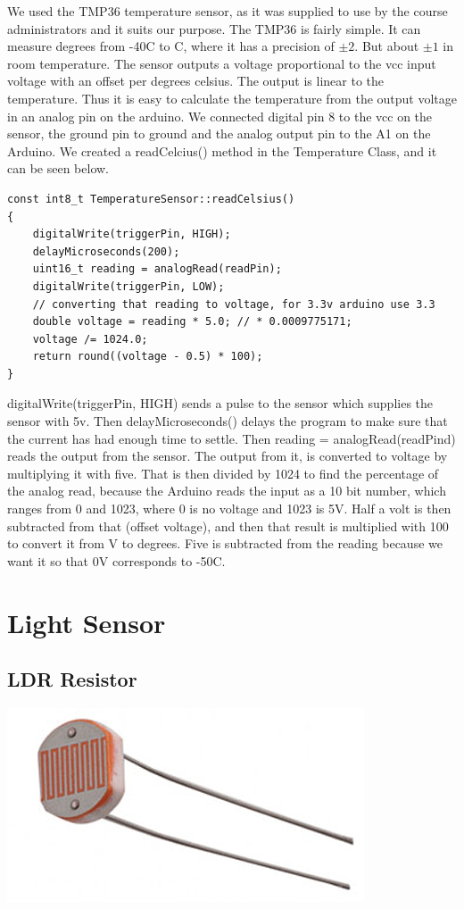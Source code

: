 \documentclass[a4paper,12pt,oneside,openright,titlepage]{book}
\begin{document}
We used the TMP36 temperature sensor, as it was supplied to use by the course administrators and it suits our purpose. The TMP36 is fairly simple. It can measure degrees from -40\textdegree{}C to C, where it has a precision\cite{tmpTutorial} of $\pm2$. But about $\pm1$ in room temperature. The sensor outputs a voltage proportional to the vcc input voltage with an offset per degrees celsius. The output is linear to the temperature. Thus it is easy to calculate the temperature from the output voltage in an analog pin on the arduino.
We connected digital pin 8 to the vcc on the sensor, the ground pin to ground and the analog output pin to the A1 on the Arduino.
We created a readCelcius() method in the Temperature Class, and it can be seen below.
\begin{lstlisting}[language=Arduino]
const int8_t TemperatureSensor::readCelsius()
{
    digitalWrite(triggerPin, HIGH);
    delayMicroseconds(200);
    uint16_t reading = analogRead(readPin);
    digitalWrite(triggerPin, LOW);
    // converting that reading to voltage, for 3.3v arduino use 3.3
    double voltage = reading * 5.0; // * 0.0009775171;
    voltage /= 1024.0;
    return round((voltage - 0.5) * 100);
}
\end{lstlisting}
digitalWrite(triggerPin, HIGH) sends a pulse to the sensor which supplies the sensor with 5v. Then delayMicroseconds() delays the program to make sure that the current has had enough time to settle. Then reading = analogRead(readPind) reads the output from the sensor. The output from it, is converted to voltage by multiplying it with five. That is then divided by 1024 to find the percentage of the analog read, because the Arduino reads the input as a 10 bit number, which ranges from 0 and 1023, where 0 is no voltage and 1023 is 5V. Half a volt is then subtracted from that (offset voltage), and then that result is multiplied with 100 to convert it from V to degrees. Five is subtracted from the reading because we want it so that 0V corresponds to -50\textdegree{}C. 

\section{Light Sensor}
\subsection{LDR Resistor}

\begin{center}
	\includegraphics[scale=0.80]{LDR-Resistor}
\end{center}
\end{document}
